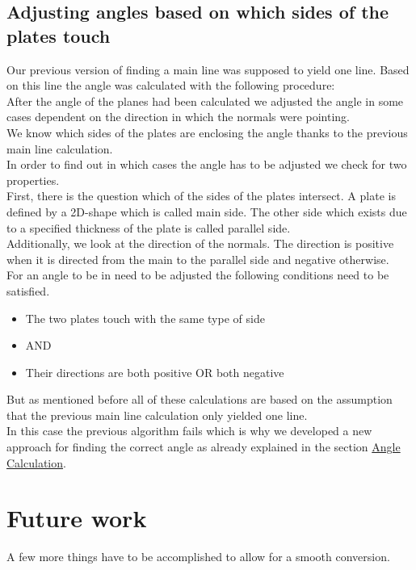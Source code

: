 \documentclass[../ClassicThesis.tex]{subfiles}
\begin{document}
\subsection{Adjusting angles based on which sides of the plates touch}
Our previous version of finding a main line was supposed to yield one line. Based on this line the angle was calculated with the following procedure:\\ 
After the angle of the planes had been calculated we adjusted the angle in some cases dependent on the direction in which the normals were pointing. \\
We know which sides of the plates are enclosing the angle thanks to the previous main line calculation.\\
In order to find out in which cases the angle has to be adjusted we check for two properties.\\
First, there is the question which of the sides of the plates intersect. A plate is defined by a 2D-shape which is called main side. The other side which exists due to a specified thickness of the plate is called parallel side.\\
Additionally, we look at the direction of the normals. The direction is positive when it is directed from the main to the parallel side and negative otherwise.\\
For an angle to be in need to be adjusted the following conditions need to be satisfied.
\begin{itemize}
    \item The two plates touch with the same type of side 
    \item[] AND
    \item Their directions are both positive OR both negative
\end{itemize}
But as mentioned before all of these calculations are based on the assumption that the previous main line calculation only yielded one line.\\
In this case the previous algorithm fails which is why we developed a new approach for finding the correct angle as already explained in the section \hyperref[angleCalculation]{Angle Calculation}.

\section{Future work}
A few more things have to be accomplished to allow for a smooth conversion. 
\end{document}
